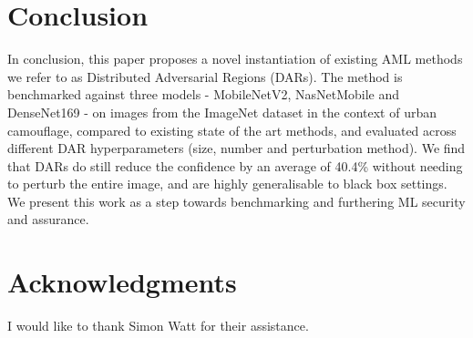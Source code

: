 \documentclass{article}
\begin{document}
\section{Conclusion}

In conclusion, this paper proposes a novel instantiation of existing AML methods we refer to as Distributed Adversarial Regions (DARs). The method is benchmarked against three models - MobileNetV2, NasNetMobile and DenseNet169 - on images from the ImageNet dataset in the context of urban camouflage, compared to existing state of the art methods, and evaluated across different DAR hyperparameters (size, number and perturbation method). We find that DARs do still reduce the confidence by an average of 40.4\% without needing to perturb the entire image, and are highly generalisable to black box settings. We present this work as a step towards benchmarking and furthering ML security and assurance.


\section*{Acknowledgments}
I would like to thank Simon Watt for their assistance.

  
  
\end{document}
